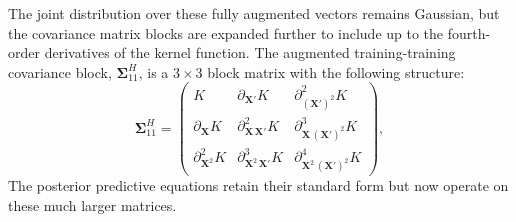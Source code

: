 \documentclass[12pt]{article}
\begin{document}
The joint distribution over these fully augmented vectors remains Gaussian, but the covariance matrix blocks are expanded further to include up to the fourth-order derivatives of the kernel function. The augmented training-training covariance block, $\boldsymbol{\Sigma}^{H}_{11}$, is a $3 \times 3$ block matrix with the following structure:
\begin{equation}
	\label{eqn:hegp_cov_matrix}
	\boldsymbol{\Sigma}^{H}_{11} =
	\begin{pmatrix}
		K & \partial_{\mathbf{X}'} K & \partial^2_{(\mathbf{X}')^2} K \\
		\partial_{\mathbf{X}} K & \partial^2_{\mathbf{X}\,\mathbf{X}'} K & \partial^3_{\mathbf{X}\,(\mathbf{X}')^2} K \\
		\partial^2_{\mathbf{X}^2} K & \partial^3_{\mathbf{X}^2\,\mathbf{X}'} K & \partial^4_{\mathbf{X}^2\,(\mathbf{X}')^2} K
	\end{pmatrix},
\end{equation}
The posterior predictive equations retain their standard form but now operate on these much larger matrices.
\end{document}
